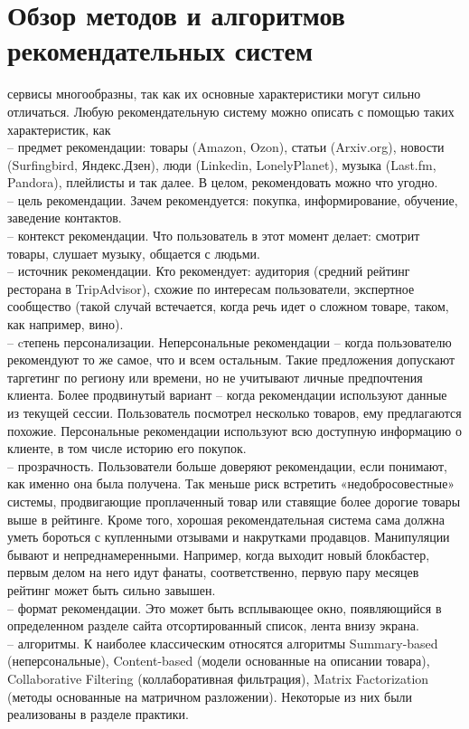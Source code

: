 \documentclass{article}
\newcommand\tab[1][1cm]{\hspace*{#1}}
\begin{document}
\section{Обзор методов и алгоритмов рекомендательных систем}
 сервисы многообразны, так как их основные характеристики могут сильно отличаться. Любую рекомендательную систему можно описать с помощью таких характеристик, как \\
\tab– предмет рекомендации: товары (Amazon, Ozon), статьи (Arxiv.org), новости (Surfingbird, Яндекс.Дзен), люди (Linkedin, LonelyPlanet), музыка (Last.fm, Pandora), плейлисты и так далее. В целом, рекомендовать можно что угодно. \\
\tab– цель рекомендации. Зачем рекомендуется: покупка, информирование, обучение, заведение контактов. \\
\tab– контекст рекомендации. Что пользователь в этот момент делает: смотрит товары, слушает музыку, общается с людьми. \\
\tab– источник рекомендации. Кто рекомендует: аудитория (средний рейтинг ресторана в TripAdvisor), схожие по интересам пользователи, экспертное сообщество (такой случай встечается, когда речь идет о сложном товаре, таком, как например, вино).\\
\tab– cтепень персонализации. Неперсональные рекомендации – когда пользователю рекомендуют то же самое, что и всем остальным. Такие предложения допускают таргетинг по региону или времени, но не учитывают личные предпочтения клиента. Более продвинутый вариант – когда рекомендации используют данные из текущей сессии. Пользователь посмотрел несколько товаров, ему предлагаются похожие. Персональные рекомендации используют всю доступную информацию о клиенте, в том числе историю его покупок.\\
\tab– прозрачность. Пользователи больше доверяют рекомендации, если понимают, как именно она была получена. Так меньше риск встретить «недобросовестные» системы, продвигающие проплаченный товар или ставящие более дорогие товары выше в рейтинге. Кроме того, хорошая рекомендательная система сама должна уметь бороться с купленными отзывами и накрутками продавцов. Манипуляции бывают и непреднамеренными. Например, когда выходит новый блокбастер, первым делом на него идут фанаты, соответственно, первую пару месяцев рейтинг может быть сильно завышен.\\
\tab– формат рекомендации. Это может быть всплывающее окно, появляющийся в определенном разделе сайта отсортированный список, лента внизу экрана.\\
\tab– алгоритмы. К наиболее классическим относятся алгоритмы Summary-based (неперсональные), Content-based (модели основанные на описании товара), Collaborative Filtering (коллаборативная фильтрация), Matrix Factorization (методы основанные на матричном разложении). Некоторые из них были реализованы в разделе практики.
\newpage
\end{document}
